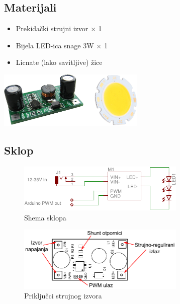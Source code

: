 \documentclass[times, utf8, zavrsni, numeric, sort]{fer}
\begin{document}
\subsection{Materijali}

\begin{minipage}{1.0\textwidth}

	\begin{itemize}
		\setlength{\itemsep}{0pt}
		\setlength{\parskip}{0pt}

		\item Prekidački strujni izvor $\times$ 1
		\item Bijela LED-ica snage 3W $\times$ 1
		\item Licnate (lako savitljive) žice
	\end{itemize}

	\centering
	\includegraphics[width=7cm]{./Fotke/1W LED/Materijal.jpg}
	\label{fig:slika1}
\end{minipage}



\subsection{Sklop}

\begin{figure}[htb]
	\centering
	\includegraphics[width=8cm]{./Sklopovi/1W LED/sklop.pdf}
	\caption{Shema sklopa}
	\label{fig:ledshema}
\end{figure}

\begin{figure}[htb]
	\centering
	\includegraphics[width=8cm]{./Sklopovi/1W LED/pinout.pdf}
	\caption{Priključci strujnog izvora}
	\label{fig:leddriverpinout}
\end{figure}
\end{document}
